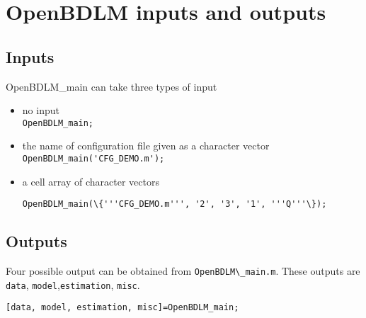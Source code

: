 \section{OpenBDLM inputs and outputs}
\label{S:OpenBDLMINPUTOUTPUT}

\subsection{Inputs}
\label{SS:OpenBDLMinput}
OpenBDLM\_main can take three types of input
\begin{itemize}
  \item no input \\ 
  
  \colorbox{light-gray}{\lstinline[basicstyle = \mlttfamily \small]!OpenBDLM_main;!} \\  
  \item the name of configuration file given as a character vector\\ 
  
    \colorbox{light-gray}{\lstinline[basicstyle = \mlttfamily \small]!OpenBDLM_main('CFG_DEMO.m');!} \\ 
      
  \item a cell array of character vectors\\
  
\raggedright{\colorbox{light-gray}{\lstinline[basicstyle = \mlttfamily \small]!OpenBDLM_main(\{'''CFG_DEMO.m''', '2', '3', '1', '''Q'''\});!}} \\
\end{itemize}

\subsection{Outputs}

 Four possible output can be obtained from \lstinline[basicstyle = \mlttfamily \small]!OpenBDLM\_main.m!.
 These outputs are \lstinline[basicstyle = \mlttfamily \small ]!data!, \lstinline[basicstyle = \mlttfamily \small ]!model!,\lstinline[basicstyle = \mlttfamily \small ]!estimation!, \lstinline[basicstyle = \mlttfamily \small ]!misc!.\\
 
 \raggedright{\colorbox{light-gray}{\lstinline[basicstyle = \mlttfamily \small]![data, model, estimation, misc]=OpenBDLM_main;!}} \\

